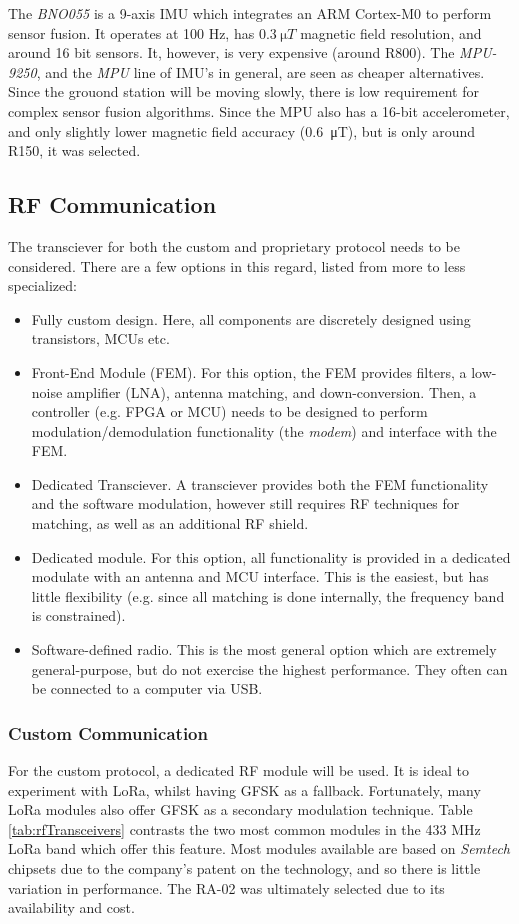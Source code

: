 The \textit{BNO055} is a 9-axis IMU which integrates an ARM Cortex-M0 to perform sensor fusion. It operates at 100 Hz, has $\SI{0.3}{\micro T}$ magnetic field resolution, and around 16 bit sensors. It, however, is very expensive (around R800). The \textit{MPU-9250}, and the \textit{MPU} line of IMU's in general, are seen as cheaper alternatives. Since the grouond station will be moving slowly, there is low requirement for complex sensor fusion algorithms. Since the MPU also has a 16-bit accelerometer, and only slightly lower magnetic field accuracy (\SI{0.6}{\micro T}), but is only around R150, it was selected.

\subsection{RF Communication}
The transciever for both the custom and proprietary protocol needs to be considered. There are a few options in this regard, listed from more to less specialized:
\begin{itemize}
    \item Fully custom design. Here, all components are discretely designed using transistors, MCUs etc.
    \item Front-End Module (FEM). For this option, the FEM provides filters, a low-noise amplifier (LNA), antenna matching, and down-conversion. Then, a controller (e.g. FPGA or MCU) needs to be designed to perform modulation/demodulation functionality (the \textit{modem}) and interface with the FEM.
    \item Dedicated Transciever. A transciever provides both the FEM functionality and the software modulation, however still requires RF techniques for matching, as well as an additional RF shield.
    \item Dedicated module. For this option, all functionality is provided in a dedicated modulate with an antenna and MCU interface. This is the easiest, but has little flexibility (e.g. since all matching is done internally, the frequency band is constrained).
    \item Software-defined radio. This is the most general option which are extremely general-purpose, but do not exercise the highest performance. They often can be connected to a computer via USB.
\end{itemize}

\subsubsection{Custom Communication}
For the custom protocol, a dedicated RF module will be used. It is ideal to experiment with LoRa, whilst having GFSK as a fallback. Fortunately, many LoRa modules also offer GFSK as a secondary modulation technique. Table \ref{tab:rfTransceivers} contrasts the two most common modules in the 433 MHz LoRa band which offer this feature. Most modules available are based on \textit{Semtech} chipsets due to the company's patent on the technology, and so there is little variation in performance. The RA-02 was ultimately selected due to its availability and cost.

